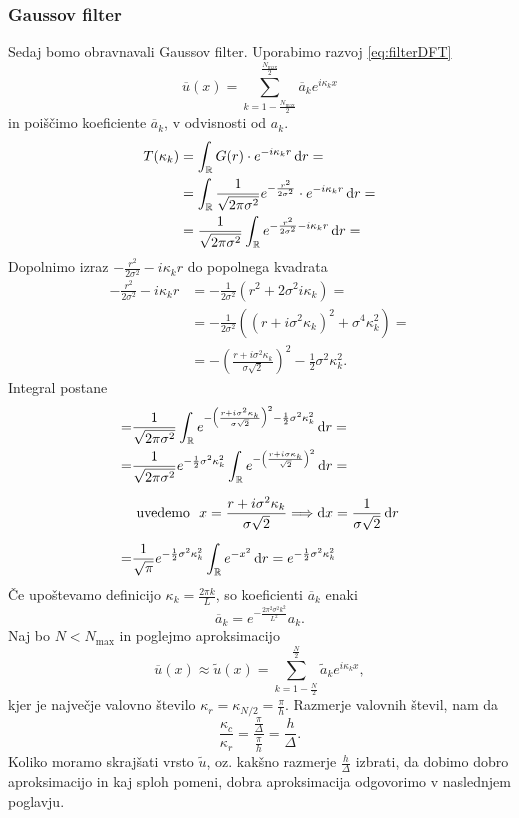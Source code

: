 \documentclass[mat2, tisk]{fmfdelo}
\newcommand{\R}{\mathbb R}
\begin{document}
\subsubsection{Gaussov filter}

Sedaj bomo obravnavali Gaussov filter. Uporabimo razvoj \ref{eq:filterDFT}
$$
\overline{u}(x) = \sum_{k=1 - \frac{N_{\text{max}}}{2}}^\frac{N_{\text{max}}}{2} \overline{a}_k e^{i\kappa_k x}
$$
in poiščimo koeficiente $\overline{a}_k$, v odvisnosti od $a_k$.
\begin{align*}
T(\kappa_k) &= \int_\R G(r) \cdot e^{-i\kappa_k r} \dif r = \\
            &=\int_\R \frac{1}{\sqrt{2\pi \sigma^2}} e^{-\frac{r^2}{2\sigma^2}} \cdot e^{-i\kappa_k r} \dif r = \\
            &= \frac{1}{\sqrt{2\pi \sigma^2}} \int_\R e^{-\frac{r^2}{2\sigma^2} - i\kappa_k r} \dif r = 
\end{align*}
Dopolnimo izraz $-\frac{r^2}{2\sigma^2} - i\kappa_k r$ do popolnega kvadrata
\begin{align*}
-\frac{r^2}{2\sigma^2} - i\kappa_k r &= - \frac{1}{2\sigma^2}(r^2 + 2\sigma^2 i \kappa_k) = \\
&=-\frac{1}{2\sigma^2} ((r + i\sigma^2 \kappa_k)^2  + \sigma^4 \kappa_k^2) = \\
&=- \left(\frac{r + i\sigma^2 \kappa_k}{\sigma\sqrt{2}}\right)^2 - \frac{1}{2} \sigma^2 \kappa_k^2.
\end{align*}
Integral postane 
\begin{align*}
  =& \frac{1}{\sqrt{2\pi \sigma^2}} \int_\R e^{-\left(\frac{r + i\sigma^2 \kappa_k}{\sigma\sqrt{2}}\right)^2 - \frac{1}{2} \sigma^2 \kappa_k^2} \dif r = \\
  =& \frac{1}{\sqrt{2\pi \sigma^2}} e^{ - \frac{1}{2} \sigma^2 \kappa_k^2} \int_\R e^{-\left(\frac{r + i\sigma \kappa_k}{\sqrt{2}}\right)^2} \dif r = \\[2mm]
  &\text{ uvedemo }\,\, x = \frac{r + i\sigma^2 \kappa_k}{\sigma\sqrt{2}} \Longrightarrow \dif x = \frac{1}{\sigma\sqrt{2}} \dif r \\[2mm]
  =& \frac{1}{\sqrt{\pi}} e^{- \frac{1}{2} \sigma^2 \kappa_k^2} \int_\R e^{-x^2} \dif r = e^{- \frac{1}{2} \sigma^2 \kappa_k^2}
\end{align*}
Če upoštevamo definicijo $\kappa_k = \frac{2\pi k}{L}$, so koeficienti $\overline{a}_k$ enaki
\begin{equation}
  \overline{a}_k = e^{-\frac{2\pi^2 \sigma^2 k^2}{L^2}} a_k.
\end{equation}
Naj bo $N < N_\text{max}$ in poglejmo aproksimacijo
\begin{equation}
\overline{u}(x) \approx \tilde{u}(x) = \sum_{k=1 - \frac{N}{2}}^\frac{N}{2} \tilde{a}_k e^{i\kappa_k x},
\end{equation}
kjer je največje valovno število $\kappa_r = \kappa_{N/2} = \frac{\pi}{h}$. Razmerje valovnih števil,
nam da 
$$
\frac{\kappa_c}{\kappa_r} = \frac{\frac{\pi}{\Delta}}{\frac{\pi}{h}} = \frac{h}{\Delta}.
$$
Koliko moramo skrajšati vrsto $\tilde{u}$, oz. kakšno razmerje $\frac{h}{\Delta}$ izbrati, da 
dobimo dobro aproksimacijo in kaj sploh pomeni, dobra aproksimacija 
odgovorimo v naslednjem poglavju. 
\end{document}
